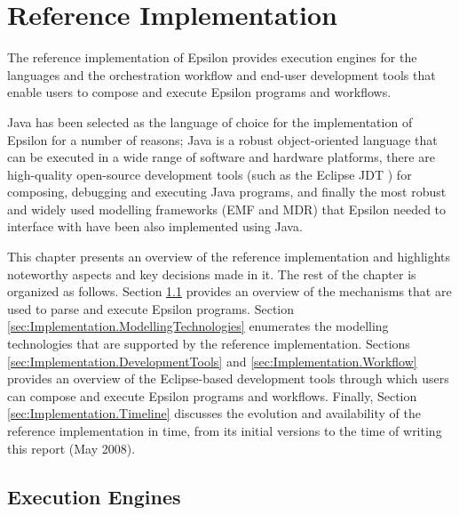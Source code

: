 \chapter{Reference Implementation}
\label{chp:ReferenceImplementation}

The reference implementation of Epsilon provides execution engines for the languages and the orchestration workflow and end-user development tools that enable users to compose and execute Epsilon programs and workflows.

Java \cite{Java} has been selected as the language of choice for the implementation of Epsilon for a number of reasons; Java is a robust object-oriented language that can be executed in a wide range of software and hardware platforms, there are high-quality open-source development tools (such as the Eclipse JDT \cite{Eclipse}) for composing, debugging and executing Java programs, and finally the most robust and widely used modelling frameworks (EMF and MDR) that Epsilon needed to interface with have been also implemented using Java.

This chapter presents an overview of the reference implementation and highlights noteworthy aspects and key decisions made in it. The rest of the chapter is organized as follows. Section \ref{sec:Implementation.ExecutionEngines} provides an overview of the mechanisms that are used to parse and execute Epsilon programs. Section \ref{sec:Implementation.ModellingTechnologies} enumerates the modelling technologies that are supported by the reference implementation. Sections \ref{sec:Implementation.DevelopmentTools} and \ref{sec:Implementation.Workflow} provides an overview of the Eclipse-based development tools through which users can compose and execute Epsilon programs and workflows. Finally, Section \ref{sec:Implementation.Timeline} discusses the evolution and availability of the reference implementation in time, from its initial versions to the time of writing this report (May 2008).

\section{Execution Engines}
\label{sec:Implementation.ExecutionEngines}

